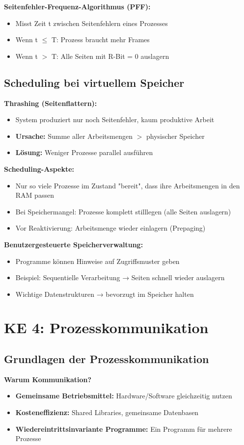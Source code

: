 \documentclass[9pt,a4paper]{extarticle}
\begin{document}
\begin{multicols*}{2}
\textbf{Seitenfehler-Frequenz-Algorithmus (PFF):}
\begin{itemize}
\item Misst Zeit t zwischen Seitenfehlern eines Prozesses
\item Wenn t $\leq$ T: Prozess braucht mehr Frames
\item Wenn t $>$ T: Alle Seiten mit R-Bit = 0 auslagern
\end{itemize}

\subsection{Scheduling bei virtuellem Speicher}
\textbf{Thrashing (Seitenflattern):}
\begin{itemize}
\item System produziert nur noch Seitenfehler, kaum produktive Arbeit
\item \textbf{Ursache:} Summe aller Arbeitsmengen $>$ physischer Speicher
\item \textbf{Lösung:} Weniger Prozesse parallel ausführen
\end{itemize}

\textbf{Scheduling-Aspekte:}
\begin{itemize}
\item Nur so viele Prozesse im Zustand "bereit", dass ihre Arbeitsmengen in den RAM passen
\item Bei Speichermangel: Prozesse komplett stilllegen (alle Seiten auslagern)
\item Vor Reaktivierung: Arbeitsmenge wieder einlagern (Prepaging)
\end{itemize}

\textbf{Benutzergesteuerte Speicherverwaltung:}
\begin{itemize}
\item Programme können Hinweise auf Zugriffsmuster geben
\item Beispiel: Sequentielle Verarbeitung → Seiten schnell wieder auslagern
\item Wichtige Datenstrukturen → bevorzugt im Speicher halten
\end{itemize}

\section{KE 4: Prozesskommunikation}

\subsection{Grundlagen der Prozesskommunikation}
\textbf{Warum Kommunikation?}
\begin{itemize}
\item \textbf{Gemeinsame Betriebsmittel:} Hardware/Software gleichzeitig nutzen
\item \textbf{Kosteneffizienz:} Shared Libraries, gemeinsame Datenbasen
\item \textbf{Wiedereintrittsinvariante Programme:} Ein Programm für mehrere Prozesse
\end{itemize}


\end{multicols*}
\end{document}
